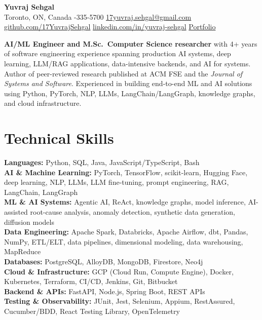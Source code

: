\documentclass[10pt,letterpaper]{extarticle}
\begin{document}
\begin{center}
{\color{accent}\fontsize{20}{23}\selectfont\bfseries Yuvraj Sehgal}\\[3pt]

{\small
Toronto, ON, Canada
\;\textbullet{}-335-5700
\;\textbullet\;
\href{mailto:17yuvraj.sehgal@gmail.com}{17yuvraj.sehgal@gmail.com}
}\\[2pt]

{\small
\href{https://github.com/17YuvrajSehgal}{github.com/17YuvrajSehgal}
\;\textbullet\;
\href{https://www.linkedin.com/in/yuvraj-sehgal/}{linkedin.com/in/yuvraj-sehgal}
\;\textbullet\;
\href{https://17yuvrajsehgal.github.io/Yuvraj-Portfolio-Website/}{Portfolio}
}
\end{center}

\vspace{-2pt}

{\small
\textbf{AI/ML Engineer and M.Sc.\ Computer Science researcher} with 4+ years of software engineering experience spanning production AI systems, deep learning, LLM/RAG applications, data-intensive backends, and AI for systems. Author of peer-reviewed research published at ACM FSE and the \textit{Journal of Systems and Software}. Experienced in building end-to-end ML and AI solutions using Python, PyTorch, NLP, LLMs, LangChain/LangGraph, knowledge graphs, and cloud infrastructure.\par}

\section{Technical Skills}

{\small
\textbf{Languages:}
Python, SQL, Java, JavaScript/TypeScript, Bash\\
\textbf{AI \& Machine Learning:}
PyTorch, TensorFlow, scikit-learn, Hugging Face, deep learning, NLP, LLMs, LLM fine-tuning, prompt engineering, RAG, LangChain, LangGraph\\
\textbf{ML \& AI Systems:}
Agentic AI, ReAct, knowledge graphs, model inference, AI-assisted root-cause analysis, anomaly detection, synthetic data generation, diffusion models\\
\textbf{Data Engineering:}
Apache Spark, Databricks, Apache Airflow, dbt, Pandas, NumPy, ETL/ELT, data pipelines, dimensional modeling, data warehousing, MapReduce\\
\textbf{Databases:}
PostgreSQL, AlloyDB, MongoDB, Firestore, Neo4j\\
\textbf{Cloud \& Infrastructure:}
GCP (Cloud Run, Compute Engine), Docker, Kubernetes, Terraform, CI/CD, Jenkins, Git, Bitbucket\\
\textbf{Backend \& APIs:}
FastAPI, Node.js, Spring Boot, REST APIs\\
\textbf{Testing \& Observability:}
JUnit, Jest, Selenium, Appium, RestAssured, Cucumber/BDD, React Testing Library, OpenTelemetry\par
}
\end{document}
